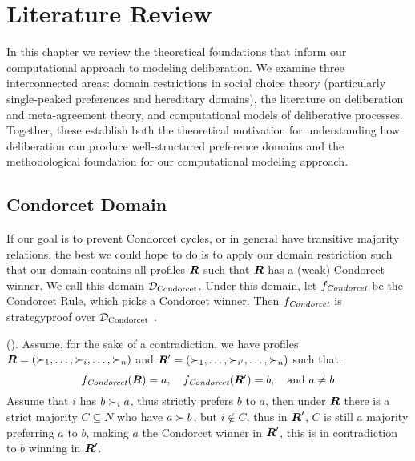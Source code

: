 \newpage
\chapter{Literature Review}
\label{Literature}




In this chapter we review the theoretical foundations that inform our
computational approach to modeling deliberation. We examine three
interconnected areas: domain restrictions in social choice theory (particularly
single-peaked preferences and hereditary domains), the literature on
deliberation and meta-agreement theory, and computational models of
deliberative processes. Together, these establish both the theoretical
motivation for understanding how deliberation can produce well-structured
preference domains and the methodological foundation for our computational
modeling approach.


\section{Condorcet Domain}
If our goal is to prevent Condorcet cycles, or in general have transitive
majority relations, the best we could hope to do is to apply our domain
restriction such that our domain contains all profiles $\boldsymbol{R}$ such that $\boldsymbol{R}$ has a
(weak) Condorcet winner. We call this domain $\mathcal{D}_{\textnormal{Condorcet}}$. Under this
domain, let $f_{\textit{Condorcet}}$ be the Condorcet Rule, which picks a
Condorcet winner. Then $f_{\textit{Condorcet}}$ is strategyproof over
$\mathcal{D}_{\textnormal{Condorcet}}$ \citep{elkindPreferenceRestrictionsComputational2022}.

\begin{proofc}{(\citet{elkindPreferenceRestrictionsComputational2022})}.
	Assume, for the sake of a contradiction, we have profiles $\boldsymbol{R} = (\succ_1, \dots, \succ_i, \dots, \succ_n)$ and $\boldsymbol{R}' = (\succ_1, \dots, \succ_{i'}, \dots, \succ_n)$ such that:
	\[
		f_{\textit{Condorcet}}(\boldsymbol{R}) = a, \quad f_{\textit{Condorcet}}(\boldsymbol{R}') = b, \quad \text{and } a \neq b
	\]
	Assume that $i$ has $b \succ_i a$, thus strictly prefers $b$ to $a$,
	then under $\boldsymbol{R}$ there is a strict majority $C \subseteq N$
	who have $a \succ b$, but $i \notin C$, thus in $\boldsymbol{R}'$, $C$
	is still a majority preferring $a$ to $b$, making $a$ the Condorcet
	winner in $\boldsymbol{R}'$, this is in contradiction to $b$ winning
	in $\boldsymbol{R}'$.
\end{proofc}

